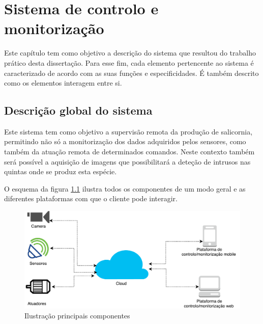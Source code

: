 

\chapter{Sistema de controlo e monitorização}


Este capítulo tem como objetivo a descrição do sistema que resultou do trabalho prático
desta dissertação. Para esse fim, cada elemento pertencente ao sistema é caracterizado de
acordo com as suas funções e especificidades. É também descrito como os elementos interagem
entre si.








\section{Descrição global do sistema}

Este sistema tem como objetivo a supervisão remota da produção de salicornia,  permitindo não só a monitorização dos dados adquiridos pelos sensores, como também da atuação remota de determinados comandos. Neste contexto também será possível a aquisição de imagens que possibilitará a deteção de intrusos nas quintas onde se produz esta espécie.

O esquema da figura \ref{componentesall} ilustra todos os componentes de um modo geral e as diferentes plataformas com que o cliente pode interagir. 

\begin{figure}[!htb]
	\centering
	\includegraphics[scale=0.45]{esquemas/global_arquitetura.pdf}
	\caption{Ilustração principais componentes}
	\label{componentesall}
\end{figure}

